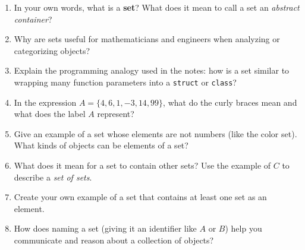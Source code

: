 \begin{enumerate}
  \item In your own words, what is a \textbf{set}? What does it mean to call a set an \emph{abstract container}?

  \item Why are sets useful for mathematicians and engineers when analyzing or categorizing objects?

  \item Explain the programming analogy used in the notes: how is a set similar to wrapping many function parameters into a \texttt{struct} or \texttt{class}?

  \item In the expression $A = \{4, 6, 1, -3, 14, 99\}$, what do the curly braces mean and what does the label $A$ represent?

  \item Give an example of a set whose elements are not numbers (like the color set). What kinds of objects can be elements of a set?

  \item What does it mean for a set to contain other sets? Use the example of $C$ to describe a \emph{set of sets}.

  \item Create your own example of a set that contains at least one set as an element.

  \item How does naming a set (giving it an identifier like $A$ or $B$) help you communicate and reason about a collection of objects?
\end{enumerate}

